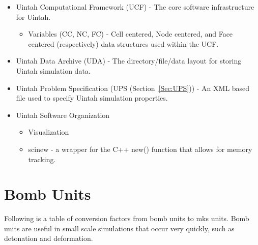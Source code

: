\begin{itemize}
\item Uintah Computational Framework (UCF) - The core software
  infrastructure for Uintah.
  \begin{itemize}
    \item Variables (CC, NC, FC) - Cell centered, Node centered, and
      Face centered (respectively) data structures used within the UCF.
  \end{itemize}

\item Uintah Data Archive (UDA) - The directory/file/data layout for
  storing Uintah simulation data.

\item Uintah Problem Specification (UPS (Section~\ref{Sec:UPS})) - An XML based file used to
  specify Uintah simulation properties.

\item Uintah Software Organization
  \begin{itemize}
    \item Visualization
    \item scinew - a wrapper for the C++ new() function that allows for memory tracking.
  \end{itemize}

\end{itemize}


\newpage
\appendix
\addappheadtotoc

\chapter{Bomb Units} \label{appendixBombUnits}

Following is a table of conversion factors from bomb units to mks units.  Bomb units are useful in small scale
simulations that occur very quickly, such as detonation and deformation. \\

